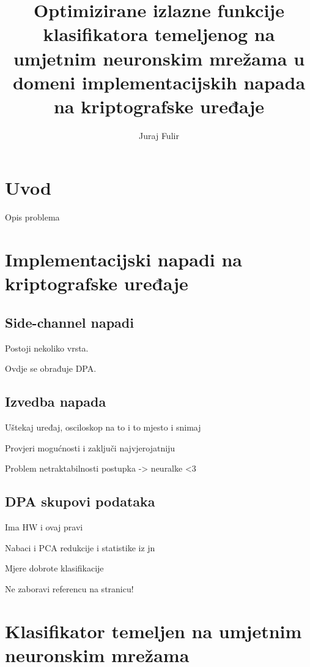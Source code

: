 \documentclass[times, utf8, diplomski]{fer}
\begin{document}

\title{Optimizirane izlazne funkcije klasifikatora temeljenog na umjetnim neuronskim mrežama u domeni implementacijskih napada na kriptografske uređaje}

\author{Juraj Fulir}

\maketitle

\izvornik


\tableofcontents

\chapter{Uvod}
Opis problema 

\chapter{Implementacijski napadi na kriptografske uređaje}

\section{Side-channel napadi}
Postoji nekoliko vrsta.

Ovdje se obrađuje DPA.

\section{Izvedba napada}
Uštekaj uređaj, osciloskop na to i to mjesto i snimaj

Provjeri mogućnosti i zaključi najvjerojatniju

Problem netraktabilnosti postupka -> neuralke <3

\section{DPA skupovi podataka}
Ima HW i ovaj pravi

Nabaci i PCA redukcije i statistike iz jn

Mjere dobrote klasifikacije

Ne zaboravi referencu na stranicu!

\chapter{Klasifikator temeljen na umjetnim neuronskim mrežama}
\end{document}
